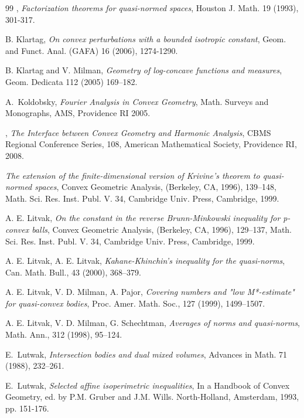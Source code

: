 \documentclass[12pt]{amsart} %
\renewcommand{\[}{\left[}
\renewcommand{\(}{\left(}
\renewcommand{\]}{\right]}
\renewcommand{\)}{\right)}
\begin{document}
\begin{thebibliography}{99}
, {\em Factorization theorems for
quasi-normed spaces}, Houston J. Math. 19 (1993), 301-317.

 {\sc B. Klartag, } {\em On convex perturbations with a bounded isotropic constant},  Geom. and Funct. Anal. (GAFA) 16 (2006), 1274-1290.


 {\sc B. Klartag and V. Milman,} {\em  Geometry of log-concave functions and measures}, Geom. Dedicata {112} (2005) 169--182.



 {\sc A.~Koldobsky},
{\em Fourier Analysis in Convex Geometry}, Math. Surveys and Monographs,
AMS, Providence RI 2005.



,  {\em The Interface between Convex Geometry and Harmonic Analysis}, CBMS Regional Conference Series, 108, American Mathematical Society, Providence RI, 2008.


 {\em  The extension of the finite-dimensional version of Krivine's theorem to quasi-normed spaces}, Convex Geometric Analysis, (Berkeley, CA, 1996), 139--148, Math. Sci. Res. Inst. Publ. V. 34, Cambridge Univ. Press, Cambridge, 1999.

 {\sc A. E. Litvak,} {\em On the constant in the reverse Brunn-Minkowski inequality for p-convex balls}, Convex Geometric Analysis, (Berkeley, CA, 1996), 129--137, Math. Sci. Res. Inst. Publ. V. 34, Cambridge Univ. Press, Cambridge, 1999.

 {\sc A. E. Litvak,}  {\sc  A. E. Litvak}, {\em Kahane-Khinchin's inequality for the quasi-norms}, Can. Math. Bull.,  43 (2000), 368--379.

 {\sc A. E. Litvak, V. D. Milman, A. Pajor},  {\em Covering numbers and "low M*-estimate" for quasi-convex bodies}, Proc. Amer. Math. Soc.,  127 (1999), 1499--1507.





 {\sc A. E. Litvak, V. D. Milman, G. Schechtman,} {\em Averages of norms and quasi-norms}, Math. Ann., 312 (1998), 95--124.


 {\sc E.~Lutwak}, {\em Intersection bodies and dual mixed volumes},
Advances in Math. 71 (1988), 232--261.

 {\sc E.~Lutwak}, {\em Selected affine isoperimetric inequalities}, In a Handbook of Convex Geometry, ed. by P.M. Gruber and J.M. Wills. North-Holland, Amsterdam, 1993, pp. 151-176.


\end{thebibliography}
\end{document}
